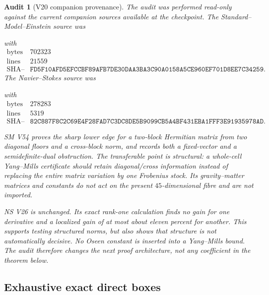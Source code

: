 \documentclass[11pt,oneside]{article}
\newtheorem{audit}[theorem]{Audit}
\theoremstyle{definition}
\theoremstyle{remark}
\begin{document}
\begin{audit}[V20 companion provenance]
\label{audit:newv20-companions}
The audit was performed read-only against the current companion
sources available at the checkpoint.  The Standard--Model--Einstein
source was
\begin{center}
\footnotesize
{}
\end{center}
with
\[
\begin{array}{c|c}
\text{bytes}&702323\\
\text{lines}&21559\\
\text{SHA--256}&
\texttt{FD5F10AFD5EFCCBF89AFB7DE30DAA3BA3C90A0158A5CE960EF701D8EE7C34259}.
\end{array}                                               \tag{20.1}
\]
The Navier--Stokes source was
\begin{center}
\footnotesize
{}
\end{center}
with
\[
\begin{array}{c|c}
\text{bytes}&278283\\
\text{lines}&5319\\
\text{SHA--256}&
\texttt{82C887F8C2C69E4F28FAD7C3DC8DE5B9099CB5A4BF431EBA1FFF3E91935978AD}.
\end{array}                                               \tag{20.2}
\]

SM V54 proves the sharp lower edge for a two-block Hermitian matrix
from two diagonal floors and a cross-block norm, and records both a
fixed-vector and a semidefinite-dual obstruction.  The transferable
point is structural: a whole-cell Yang--Mills certificate should
retain diagonal/cross information instead of replacing the entire
matrix variation by one Frobenius stock.  Its gravity--matter
matrices and constants do not act on the present \(45\)-dimensional
fibre and are not imported.

NS V26 is unchanged.  Its exact rank-one calculation finds no gain
for one derivative and a localized gain of at most about eleven
percent for another.  This supports testing structured norms, but
also shows that structure is not automatically decisive.  No Oseen
constant is inserted into a Yang--Mills bound.  The audit therefore
changes the next proof architecture, not any coefficient in the
theorem below.
\end{audit}

\subsection{Exhaustive exact direct boxes}
\end{document}
